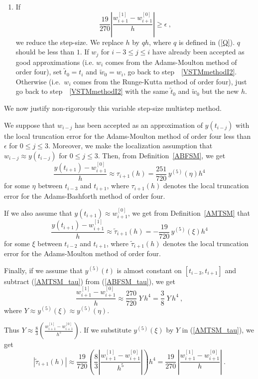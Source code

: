 \begin{algo}
\begin{enumerate}
\item If
\[
\frac{19}{270} \left| \frac{w_{i+1}^{[1]} - w_{i+1}^{[0]}}{h} \right|
\geq \epsilon \ ,
\]
we reduce the step-size.  We replace $h$ by $qh$, where $q$ is defined
in (\ref{Q}).  $q$ should be less than $1$.  If $w_j$ for $i-3 \leq j \leq i$
have already been accepted as good approximations (i.e. $w_i$
comes from the Adams-Moulton method of order four),
set $\tilde{t}_0 = t_i$ and $\tilde{w}_0= w_i$, go back to
step~~\ref{VSTMmethodI2}.  Otherwise
(i.e.\ $w_i$ comes from the Runge-Kutta method of order four), just
go back to step~~\ref{VSTMmethodI2} with the same
$\tilde{t}_0$ and $\tilde{w}_0$ but the new $h$.
\end{enumerate}
\end{algo}

We now justify non-rigorously this variable step-size multistep
method.

We suppose that $w_{i-j}$ has been accepted as an approximation of
$y(t_{i-j})$ with the local truncation error for the
Adams-Moulton method of order four less than $\epsilon$ for
$0 \leq j \leq 3$.  Moreover, we make the localization assumption that
$w_{i-j} \approx y(t_{i-j})$ for $0 \leq j \leq 3$.  Then, from
Definition~\ref{ABFSM}, we get
\begin{equation} \label{ABFSM_tau}
\frac{y(t_{i+1}) - w_{i+1}^{[0]}}{h}
\approx \tau_{i+1}(h) = \frac{251}{720}\, y^{(5)}(\eta) h^4
\end{equation}
for some $\eta$ between $t_{i-3}$ and $t_{i+1}$, where $\tau_{i+1}(h)$
denotes the local truncation error for the Adams-Bashforth method of
order four.

If we also assume that
$\displaystyle y(t_{i+1}) \approx w_{i+1}^{[0]}$, we get
from Definition~\ref{AMTSM} that
\begin{equation} \label{AMTSM_tau}
\frac{y(t_{i+1}) -w_{i+1}^{[1]}}{h} \approx
\tilde{\tau}_{i+1}(h) = -\frac{19}{720}\, y^{(5)}(\xi) h^4
\end{equation}
for some $\xi$ between $t_{i-2}$ and $t_{i+1}$, where
$\tilde{\tau}_{i+1}(h)$ denotes the local truncation error for the
Adams-Moulton method of order four.

Finally, if we assume that $y^{(5)}(t)$ is almost constant on
$[t_{i-3},t_{i+1}]$ and subtract (\ref{AMTSM_tau}) from
(\ref{ABFSM_tau}), we get
\[
\frac{w_{i+1}^{[1]} - w_{i+1}^{[0]}}{h} \approx
\frac{270}{720}\;Y \,h^4 = \frac{3}{8}\; Y \,h^4 \ ,
\]
where $Y \approx y^{(5)}(\xi) \approx y^{(5)}(\eta)$.

Thus $\displaystyle Y \approx
\frac{8}{3}\left(\frac{w_{i+1}^{[1]} - w_{i+1}^{[0]}}{h^5}\right)$.
If we substitute $y^{(5)}(\xi)$ by $Y$ in (\ref{AMTSM_tau}), we get
\[
\left| \tilde{\tau}_{i+1}(h) \right| \approx
\frac{19}{720}\left(\frac{8}{3}
\left| \frac{w_{i+1}^{[1]} - w_{i+1}^{[0]}}{h^5} \right| \right) h^4 =
\frac{19}{270}\,\left|\frac{w_{i+1}^{[1]} - w_{i+1}^{[0]}}{h}\right| \ .
\]

